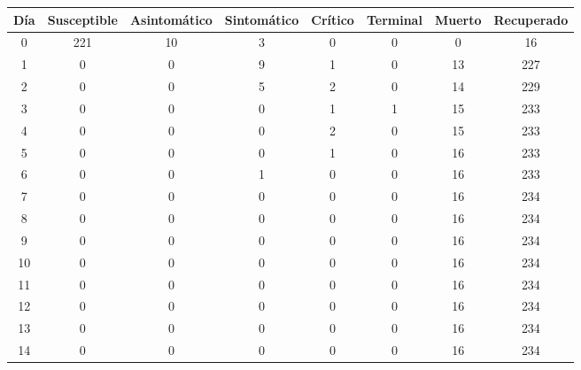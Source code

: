 \begin{center}
\begin{tabular}{|c|c|c|c|c|c|c|c|}
\hline
Día & Susceptible & Asintomático & Sintomático & Crítico & Terminal & Muerto & Recuperado \\
\hline
0 & 221 & 10 & 3 & 0 & 0 & 0 & 16 \\
1 & 0 & 0 & 9 & 1 & 0 & 13 & 227 \\
2 & 0 & 0 & 5 & 2 & 0 & 14 & 229 \\
3 & 0 & 0 & 0 & 1 & 1 & 15 & 233 \\
4 & 0 & 0 & 0 & 2 & 0 & 15 & 233 \\
5 & 0 & 0 & 0 & 1 & 0 & 16 & 233 \\
6 & 0 & 0 & 1 & 0 & 0 & 16 & 233 \\
7 & 0 & 0 & 0 & 0 & 0 & 16 & 234 \\
8 & 0 & 0 & 0 & 0 & 0 & 16 & 234 \\
9 & 0 & 0 & 0 & 0 & 0 & 16 & 234 \\
10 & 0 & 0 & 0 & 0 & 0 & 16 & 234 \\
11 & 0 & 0 & 0 & 0 & 0 & 16 & 234 \\
12 & 0 & 0 & 0 & 0 & 0 & 16 & 234 \\
13 & 0 & 0 & 0 & 0 & 0 & 16 & 234 \\
14 & 0 & 0 & 0 & 0 & 0 & 16 & 234 \\
\hline
\end{tabular}
\end{center}

